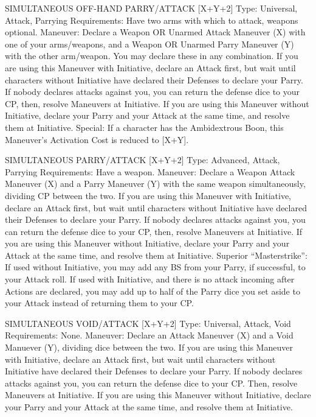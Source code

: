 \documentclass[oneside,11pt,english]{book}
\begin{document}
 

SIMULTANEOUS OFF-HAND PARRY/ATTACK [X+Y+2] 
Type: Universal, Attack, Parrying 
Requirements: Have two arms with which to attack, weapons optional. 
Maneuver: Declare a Weapon OR Unarmed Attack Maneuver (X) with one of your arms/weapons, and a 
Weapon OR Unarmed Parry Maneuver (Y) with the other arm/weapon. You may declare these in any 
combination. 
If you are using this Maneuver with Initiative, declare an Attack first, but wait until characters without 
Initiative have declared their Defenses to declare your Parry. If nobody declares attacks against you, you 
can return the defense dice to your CP, then, resolve Maneuvers at Initiative. 
If you are using this Maneuver without Initiative, declare your Parry and your Attack at the same time, 
and resolve them at Initiative. 
Special: If a character has the Ambidextrous Boon, this Maneuver’s Activation Cost is reduced to [X+Y]. 

 

SIMULTANEOUS PARRY/ATTACK [X+Y+2] 
Type: Advanced, Attack, Parrying 
Requirements: Have a weapon. 
Maneuver: Declare a Weapon Attack Maneuver (X) and a Parry Maneuver (Y) with the same weapon 
simultaneously, dividing CP between the two. 
If you are using this Maneuver with Initiative, declare an Attack first, but wait until characters without 
Initiative have declared their Defenses to declare your Parry. If nobody declares attacks against you, you 
can return the defense dice to your CP, then, resolve Maneuvers at Initiative. 
If you are using this Maneuver without Initiative, declare your Parry and your Attack at the same time, 
and resolve them at Initiative. 
Superior “Masterstrike”: If used without Initiative, you may add any BS from your Parry, if successful, 
to your Attack roll. If used with Initiative, and there is no attack incoming after Actions are declared, you 
may add up to half of the Parry dice you set aside to your Attack instead of returning them to your CP. 

 

SIMULTANEOUS VOID/ATTACK [X+Y+2] 
Type: Universal, Attack, Void 
Requirements: None. 
Maneuver: Declare an Attack Maneuver (X) and a Void Manuever (Y), dividing dice between the two. 
If you are using this Maneuver with Initiative, declare an Attack first, but wait until characters without 
Initiative have declared their Defenses to declare your Parry. If nobody declares attacks against you, you 
can return the defense dice to your CP. Then, resolve Maneuvers at Initiative. 
If you are using this Maneuver without Initiative, declare your Parry and your Attack at the same time, 
and resolve them at Initiative. 
\end{document}
